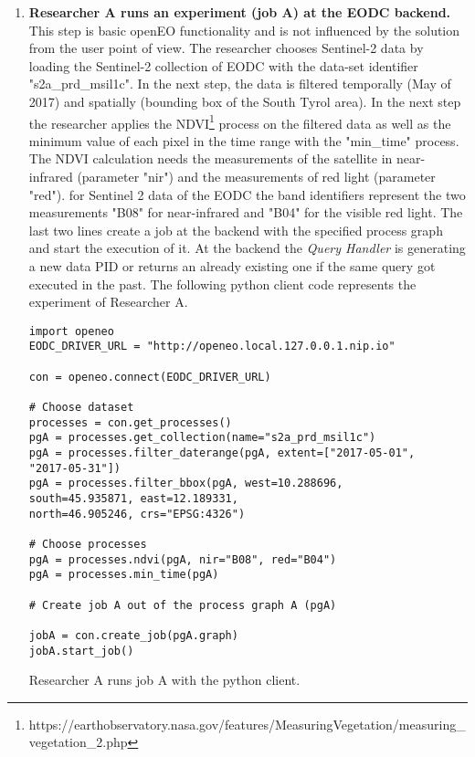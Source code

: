 \documentclass[draft,final]{vutinfth} %
\newenvironment{code}{\captionsetup{type=listing}}{}
\begin{document}
\begin{enumerate}
	\item \textbf{Researcher A runs an experiment (job A) at the EODC backend.} \\
	This step is basic openEO functionality and is not influenced by the solution from the user point of view. The researcher chooses Sentinel-2 data by loading the Sentinel-2 collection of EODC with the data-set identifier "s2a\_prd\_msil1c". In the next step, the data is filtered temporally (May of 2017) and spatially (bounding box of the South Tyrol area). In the next step the researcher applies the NDVI\footnote{https://earthobservatory.nasa.gov/features/MeasuringVegetation/measuring\_vegetation\_2.php} process on the filtered data as well as the minimum value of each pixel in the time range with the "min\_time" process. The NDVI calculation needs the measurements of the satellite in near-infrared (parameter "nir") and the measurements of red light (parameter "red"). for Sentinel 2 data of the EODC the band identifiers represent the two measurements "B08" for near-infrared and "B04" for the visible red light. The last two lines create a job at the backend with the specified process graph and start the execution of it.
	At the backend the \textit{Query Handler} is generating a new data PID or returns an already existing one if the same query got executed in the past. The following python client code represents the experiment of Researcher A.
	
\begin{code}
	\begin{verbatim}
import openeo
EODC_DRIVER_URL = "http://openeo.local.127.0.0.1.nip.io"

con = openeo.connect(EODC_DRIVER_URL)

# Choose dataset
processes = con.get_processes()
pgA = processes.get_collection(name="s2a_prd_msil1c")
pgA = processes.filter_daterange(pgA, extent=["2017-05-01", 
"2017-05-31"])
pgA = processes.filter_bbox(pgA, west=10.288696, 
south=45.935871, east=12.189331, 
north=46.905246, crs="EPSG:4326")

# Choose processes
pgA = processes.ndvi(pgA, nir="B08", red="B04")
pgA = processes.min_time(pgA)

# Create job A out of the process graph A (pgA)

jobA = con.create_job(pgA.graph)
jobA.start_job()
	\end{verbatim}
	\caption{Researcher A runs job A with the python client.}
	\label{lst:impl_usecase1_1}
\end{code}	


\end{enumerate}
\end{document}

